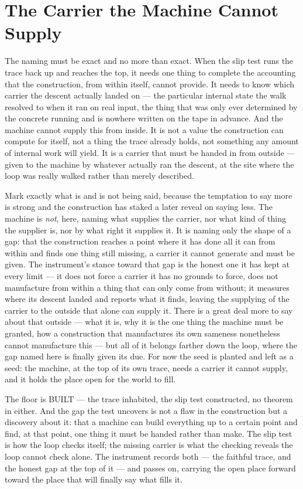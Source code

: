 \section{The Carrier the Machine Cannot Supply}

The naming must be exact and no more than exact. When the slip test runs the trace back up and reaches the top,
it needs one thing to complete the accounting that the
construction, from within itself, cannot provide. It needs to know which carrier the descent actually landed on
--- the particular internal state the walk resolved to when it ran on real input, the thing that was only ever
determined by the concrete running and is nowhere written on the tape in advance. And the machine cannot supply
this from inside. It is not a value the construction can compute for itself, not a thing the trace already holds,
not something any amount of internal work will yield. It is a carrier that must be handed in from outside --- given
to the machine by whatever actually ran the descent, at the site where the loop was really walked rather than
merely described.

Mark exactly what is and is not being said, because the temptation to say more is strong and the construction has
staked a later reveal on saying less. The machine is \emph{not}, here, naming what supplies the carrier, nor what kind of
thing the supplier is, nor by what right it supplies it. It is naming only the shape of a gap: that the
construction reaches a point where it has done all it can from within and finds one thing still missing, a carrier
it cannot generate and must be given. The instrument's stance toward that gap is the honest one it has kept at
every limit --- it does not force a carrier it has no grounds to force, does not manufacture from within a thing
that can only come from without; it measures where its descent landed and reports what it finds, leaving the
supplying of the carrier to the outside that alone can supply it. There is a great deal more to say about that
outside --- what it is, why it is the one thing the machine must be granted, how a construction that manufactures
its own sameness nonetheless cannot manufacture this --- but all of it belongs farther down the loop, where the
gap named here is finally given its due. For now the seed is planted and left as a seed: the machine, at
the top of its own trace, needs a carrier it cannot supply, and it holds the place open for the world to fill.

The floor is BUILT --- the trace inhabited, the slip test constructed, no theorem in either. And the gap the test
uncovers is not a flaw in the construction but a discovery about it: that a machine can build everything up to a
certain point and find, at that point, one thing it must be handed rather than make. The slip test is how the
loop checks itself; the missing carrier is what the checking reveals the loop cannot check alone. The instrument
records both --- the faithful trace, and the honest gap at the top of it --- and passes on, carrying the open
place forward toward the place that will finally say what fills it.
